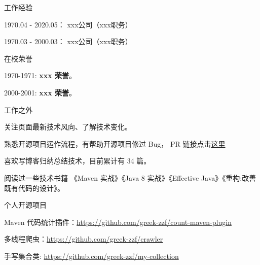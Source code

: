 



\begin{cventries}

  \cventryself
    {} %
    {工作经验} %
    {} %
    {} %
    {
      \begin{cvitems} %
        \item {1970.04 - 2020.05： xxx公司（xxx职务）}
        \item {1970.03 - 2000.03： xxx公司（xxx职务）}
      \end{cvitems}
    }

  \cventryself
    {} %
    {在校荣誉} %
    {} %
    {} %
    {
      \begin{cvitems} %
        \item {1970-1971: \textbf{xxx 荣誉}。}
        \item {2000-2001: \textbf{xxx 荣誉}。}
      \end{cvitems}
    }
    
  \cventryself
    {} %
    {工作之外} %
    {} %
    {} %
    {
      \begin{cvitems} %
        \item {关注页面最新技术风向、了解技术变化。}
        \item {熟悉开源项目运作流程，有帮助开源项目修过 Bug， PR 链接点击\href{https://github.com/ByteLegendQuest/java-write-javadoc/pull/9}{这里}}
        \item {喜欢写博客归纳总结技术，目前累计有 34 篇。}
        \item {阅读过一些技术书籍 《Maven 实战》《Java 8 实战》《Effective Java》《重构:改善既有代码的设计》。}
      \end{cvitems}
    }
    
  \cventryself
    {} %
    {个人开源项目} %
    {} %
    {} %
    {
      \begin{cvitems} %
        \item {Maven 代码统计插件：\url{https://github.com/greek-zzf/count-maven-plugin}}
        \item {多线程爬虫：\url{https://github.com/greek-zzf/crawler}}
        \item {手写集合类: \url{https://github.com/greek-zzf/my-collection}}
      \end{cvitems}
    }
    
\end{cventries}

